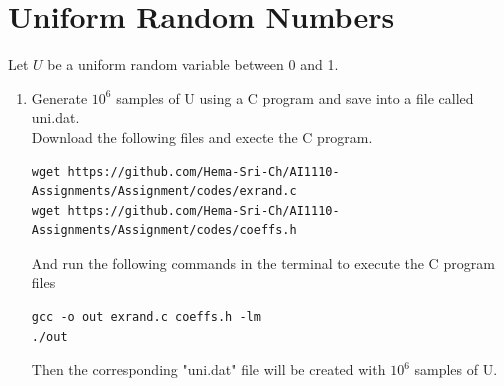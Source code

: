 \documentclass[journal,12pt,twocolumn]{article}
\renewcommand\thesection{\arabic{section}}
\begin{document}
\section{Uniform Random Numbers}
Let $U$ be a uniform random variable between 0 and 1.
\begin{enumerate}[label=\thesection.\arabic*
,ref=\thesection.\theenumi]
\item Generate $10^6$ samples of U using a C program and save into a file called uni.dat.
\\
\solution 
Download the following files and execte the C program.
\begin{lstlisting}
wget https://github.com/Hema-Sri-Ch/AI1110-Assignments/Assignment/codes/exrand.c
wget https://github.com/Hema-Sri-Ch/AI1110-Assignments/Assignment/codes/coeffs.h
\end{lstlisting}
And run the following commands in the terminal to execute the C program files
\begin{lstlisting}
gcc -o out exrand.c coeffs.h -lm
./out
\end{lstlisting}
Then the corresponding "uni.dat" file will be created with $10^6$ samples of U.


\end{enumerate}
\end{document}

